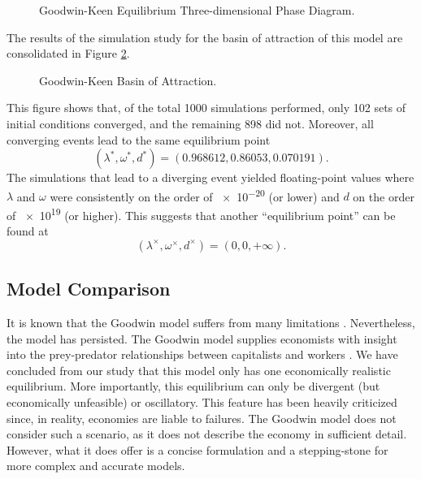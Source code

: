 \documentclass[12pt, centerh1]{article}
\begin{document}
\begin{figure}[H]
    \centering
    
    \caption{Goodwin-Keen Equilibrium Three-dimensional Phase Diagram.}
    \label{fig:keen_phase}
\end{figure}
\noindent The results of the simulation study for the basin of attraction of this model are consolidated in Figure \ref{fig:keen_study}.
\begin{figure}[H]
    \centering
    
    \caption{Goodwin-Keen Basin of Attraction.}
    \label{fig:keen_study}
\end{figure}
\noindent This figure shows that, of the total 1000 simulations performed, only 102 sets of initial conditions converged, and the remaining 898 did not. Moreover, all converging events lead to the same equilibrium point
\begin{equation}
    (\lambda^\ast, \omega^\ast, d^\ast) = (0.968612, 0.86053, 0.070191).
\end{equation}
The simulations that lead to a diverging event yielded floating-point values where $\lambda$ and $\omega$ were consistently on the order of \num{e-20} (or lower) and $d$ on the order of \num{e19} (or higher). This suggests that another ``equilibrium point'' can be found at
\begin{equation}
    (\lambda^\times, \omega^\times, d^\times) = (0, 0, +\infty).
\end{equation}

\subsection{Model Comparison} 
It is known that the Goodwin model suffers from many limitations \citep{harvie2000testing, moura2013testing}. Nevertheless, the model has persisted. The Goodwin model supplies economists with insight into the prey-predator relationships between capitalists and workers \citep{goodwin1982growth}. We have concluded from our study that this model only has one economically realistic equilibrium. More importantly, this equilibrium can only be divergent (but economically unfeasible) or oscillatory. This feature has been heavily criticized since, in reality, economies are liable to failures. The Goodwin model does not consider such a scenario, as it does not describe the economy in sufficient detail. However, what it does offer is a concise formulation and a stepping-stone for more complex and accurate models.
\end{document}
